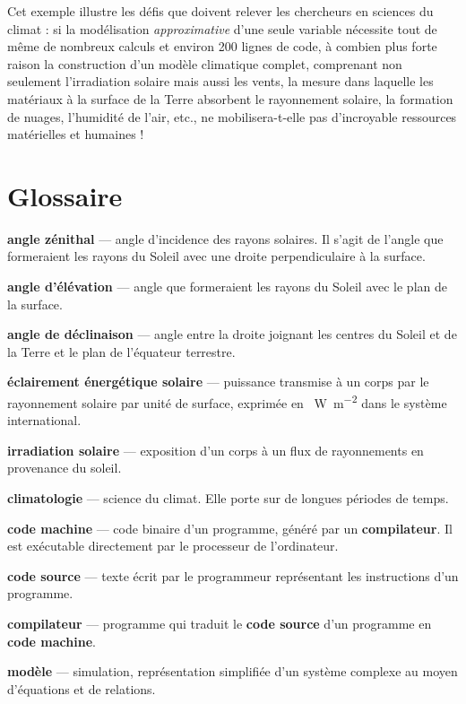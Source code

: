 \documentclass[12pt]{article}
\begin{document}
Cet exemple illustre les défis que doivent relever les chercheurs en sciences du climat : si la modélisation \emph{approximative} d'une seule variable nécessite tout de même de nombreux calculs et environ 200 lignes de code, à combien plus forte raison la construction d'un modèle climatique complet, comprenant non seulement l'irradiation solaire mais aussi les vents, la mesure dans laquelle les matériaux à la surface de la Terre absorbent le rayonnement solaire, la formation de nuages, l'humidité de l'air, etc., ne mobilisera-t-elle pas d'incroyable ressources matérielles et humaines !


\clearpage

\section{Glossaire}

\textbf{angle zénithal} --- angle d'incidence des rayons solaires.
Il s'agit de l'angle que formeraient les rayons du Soleil avec une droite perpendiculaire à la surface.

\textbf{angle d'élévation} --- angle que formeraient les rayons du Soleil avec le plan de la surface.

\textbf{angle de déclinaison} --- angle entre la droite joignant les centres du Soleil et de la Terre et le plan de l'équateur terrestre.

\textbf{éclairement énergétique solaire} --- puissance transmise à un corps par le rayonnement solaire par unité de surface, exprimée en \SI{}{\watt\per\square\meter} dans le système international.

\textbf{irradiation solaire} --- exposition d'un corps à un flux de rayonnements en provenance du soleil.

\textbf{climatologie} --- science du climat. Elle porte sur de longues périodes de temps.

\textbf{code machine} --- code binaire d'un programme, généré par un \textbf{compilateur}. Il est exécutable directement par le processeur de l'ordinateur.

\textbf{code source} --- texte écrit par le programmeur représentant les instructions d'un programme.

\textbf{compilateur} --- programme qui traduit le \textbf{code source} d'un programme en \textbf{code machine}.

\textbf{modèle} --- simulation, représentation simplifiée d'un système complexe au moyen d'équations et de relations.
\end{document}
